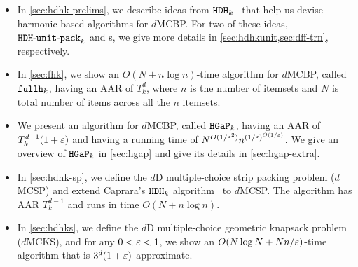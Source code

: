 \begin{itemize}
\item In \cref{sec:hdhk-prelims}, we describe ideas from $\operatorname{\mathtt{HDH}}_{k}$~\cite{caprara2008}
    that help us devise harmonic-based algorithms for $d$MCBP.
    For two of these ideas, $\operatorname{\mathtt{HDH-unit-pack}}_k$ and \dff{}s,
    we give more details in \cref{sec:hdhkunit,sec:dff-trn}, respectively.
\item In \cref{sec:fhk}, we show an $O(N + n\log n)$-time algorithm for $d$MCBP,
    called $\operatorname{\mathtt{fullh}}_k$, having an AAR of $T_k^d$, where $n$ is the number of itemsets
    and $N$ is total number of items across all the $n$ itemsets.
\item We present an algorithm for $d$MCBP, called $\operatorname{\mathtt{HGaP}}_k$, having an AAR of
    $T_k^{d-1}(1+\varepsilon)$ and having a running time of $N^{O(1/\varepsilon^2)}n^{(1/\varepsilon)^{O(1/\varepsilon)}}$.
    We give an overview of $\operatorname{\mathtt{HGaP}}_k$ in \cref{sec:hgap}
    and give its details in \cref{sec:hgap-extra}.
\item In \cref{sec:hdhk-sp}, we define the $d$D multiple-choice strip packing problem ($d$MCSP)
    and extend Caprara's $\operatorname{\mathtt{HDH}}_{k}$ algorithm~\cite{caprara2008} to $d$MCSP.
    The algorithm has AAR $T_k^{d-1}$ and runs in time $O(N + n\log n)$.
\item In \cref{sec:hdhks}, we define the $d$D multiple-choice geometric knapsack problem ($d$MCKS),
    and for any $0 < \varepsilon < 1$, we show an $O(N\log N + Nn/\varepsilon)$-time algorithm
    that is $3^d(1+\varepsilon)$-approximate.
\end{itemize}
